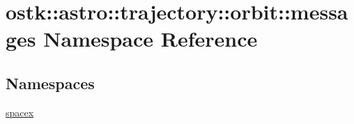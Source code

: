 \hypertarget{namespaceostk_1_1astro_1_1trajectory_1_1orbit_1_1messages}{}\section{ostk\+:\+:astro\+:\+:trajectory\+:\+:orbit\+:\+:messages Namespace Reference}
\label{namespaceostk_1_1astro_1_1trajectory_1_1orbit_1_1messages}
\subsection*{Namespaces}
\begin{DoxyCompactItemize}
\item 
 \hyperlink{namespaceostk_1_1astro_1_1trajectory_1_1orbit_1_1messages_1_1spacex}{spacex}
\end{DoxyCompactItemize}

